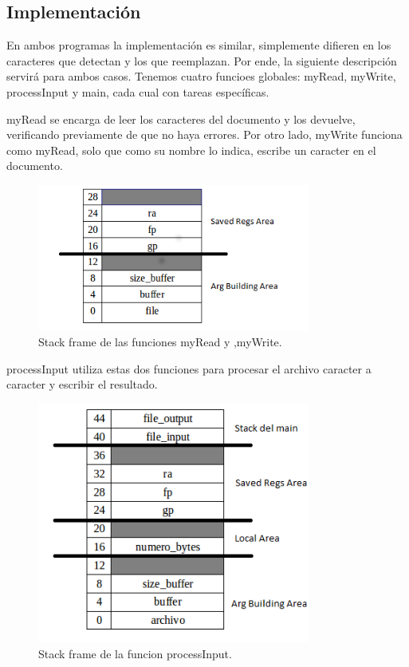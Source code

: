 \documentclass[a4paper]{article}
\begin{document}
\subsection{Implementación}

En ambos programas la implementación es similar, simplemente difieren en los caracteres que detectan y los que reemplazan. Por ende, la siguiente descripción servirá para ambos casos. Tenemos cuatro funcioes globales: myRead, myWrite, processInput y main, cada cual con tareas específicas.


myRead se encarga de leer los caracteres del documento y los devuelve, verificando previamente de que no haya errores. Por otro lado, myWrite funciona como myRead, solo que como su nombre lo indica, escribe un caracter en el documento.

\begin{figure}[!htp]
\begin{center}
\includegraphics[width=0.8\textwidth]{stack-read-write1.png}
\caption{Stack frame de las funciones myRead y ,myWrite.} \label{fig001}
\end{center}
\end{figure}


processInput utiliza estas dos funciones para procesar el archivo caracter a caracter y escribir el resultado.
\begin{figure}[!htp]
\begin{center}
\includegraphics[width=0.8\textwidth]{stack-procesar1.png}
\caption{Stack frame de la funcion processInput.} \label{fig001}
\end{center}
\end{figure}
\end{document}
